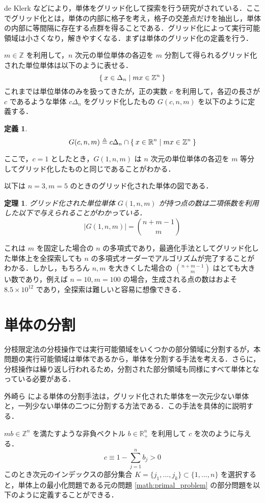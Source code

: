 \documentclass[a4paper,11pt]{jreport}
\newtheorem{definition}{定義}
\newtheorem{theorem}{定理}
\begin{document}
de Klerk \cite{deklerk} などにより，単体をグリッド化して探索を行う研究がされている．ここでグリッド化とは，単体の内部に格子を考え，格子の交差点だけを抽出し，単体の内部に等間隔に存在する点群を得ることである．グリッド化によって実行可能領域は小さくなり，解きやすくなる．まずは単体のグリッド化の定義を行う．\par
$ m \in \mathbb{Z} $ を利用して，$ n $ 次元の単位単体の各辺を $ m $ 分割して得られるグリッド化された単位単体は以下のように表せる．
$$ \Set{ x \in \Delta_n | mx \in \mathbb{Z}^n } $$
これまでは単位単体のみを扱ってきたが，正の実数 $ c $ を利用して，各辺の長さが $ c $ であるような単体 $ c \Delta_n $ をグリッド化したもの $ G(c, n, m) $ を以下のように定義する．\par
\begin{definition}
$$ G(c, n, m) \triangleq c \Delta_n \cap \Set{x \in \mathbb{R}^n | mx \in \mathbb{Z}^n} $$
\end{definition}
ここで，$ c = 1 $ としたとき，$ G(1, n, m) $ は $ n $ 次元の単位単体の各辺を $ m $ 等分してグリッド化したものと同じであることがわかる．\par
以下は $ n = 3, m = 5 $ のときのグリッド化された単体の図である．\par

\begin{theorem} \label{theorem:n_grid}
グリッド化された単位単体 $ G(1, n, m) $ が持つ点の数は二項係数を利用した以下で与えられることがわかっている．
$$ | G(1, n, m) | = \binom{n + m - 1}{m} $$
\end{theorem}
これは $ m $ を固定した場合の $ n $ の多項式であり，最適化手法としてグリッド化した単体上を全探索しても $ n $ の多項式オーダーでアルゴリズムが完了することがわかる．しかし，もちろん $ n, m $ を大きくした場合の $ \binom{n + m - 1}{m} $ はとても大きい数であり，例えば $ n = 10, m = 100 $ の場合，生成される点の数はおよそ $ 8.5 \times 10^{12} $ であり，全探索は難しいと容易に想像できる．

\section{単体の分割} \label{partition}

分枝限定法の分枝操作では実行可能領域をいくつかの部分領域に分割するが，本問題の実行可能領域は単体であるから，単体を分割する手法を考える．さらに，分枝操作は繰り返し行われるため，分割された部分領域も同様にすべて単体となっている必要がある．\par
外崎ら \cite{tonosaki} による単体の分割手法は，グリッド化された単体を一次元少ない単体と，一列少ない単体の二つに分割する方法である．この手法を具体的に説明する．\par
$ mb \in \mathbb{Z}^n $ を満たすような非負ベクトル $ b \in \mathbb{R}^n_{+} $ を利用して $ c $ を次のように与える．
$$ c \equiv 1 - \sum_{j=1}^{n} b_j > 0 $$
このとき次元のインデックスの部分集合 $ K = \{j_1, ..., j_k\} \subset \{1, ..., n\} $ を選択すると，単体上の最小化問題である元の問題 \ref{math:primal_problem} の部分問題を以下のように定義することができる．
\end{document}
